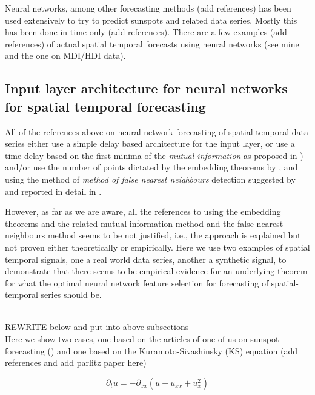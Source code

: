 \documentclass[journal]{IEEEtran}
\begin{document}
Neural networks, among other forecasting methods (add references) has been used extensively to try to predict sunspots and related
data series. Mostly this has been done in time only (add references). There are a few examples (add references) of actual spatial temporal
forecasts using neural networks (see mine and the one on MDI/HDI data).

\subsection{Input layer architecture for neural networks for spatial temporal forecasting}

All of the references above on neural network forecasting of spatial temporal data series either use a simple delay based architecture
for the input layer, or use a time delay based on the first minima of the {\em mutual information} as proposed in 
\cite{Fraser86, abarbanel1997analysis, opac-b1092652}) and/or use the number of points dictated by
the embedding theorems by \cite{key1503303m}, \cite{1981LNM...898..366T, 1981LNM...898..230M} and \cite{1991JSP....65..579S}
using the method of {\em method of false nearest neighbours} detection suggested by
\cite{1992PhRvA..45.3403K} and reported in detail in
\cite{1992PhRvA..45.7058M, 1993RvMP...65.1331A, 1996PhT....49k..86A, abarbanel1997analysis}.

However, as far as we are aware, all the references to using the embedding theorems and the related  mutual information
method and the false nearest neighbours method seems to be not justified, i.e., the approach is explained but not proven
either theoretically or empirically. Here we use two examples of spatial temporal signals, one a real world data series, another
a synthetic signal, to demonstrate that there seems to be empirical evidence for an underlying theorem for what the optimal 
 neural network feature selection for forecasting of spatial-temporal series should be.

\\
REWRITE below and put into above subsections
\\

Here we show two cases, one based on the articles of one of us on sunspot forecasting (\cite{Covas, covas2016, covaspeixinhojoao})
and one based on the Kuramoto-Sivashinsky (KS) equation (add references and add parlitz paper here)

$$\partial_t u = -\partial_{xx}(u+u_{xx}+u_x^2)$$
\end{document}
